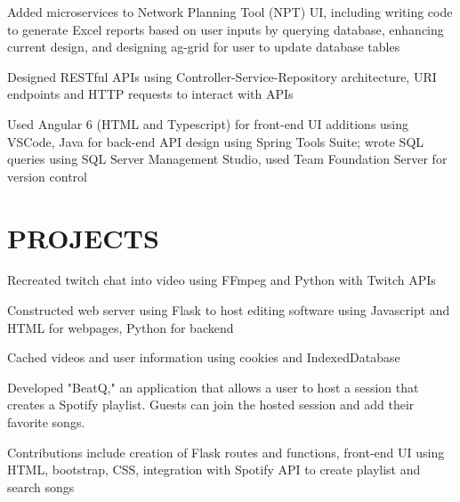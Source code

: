 \documentclass[]{deedy-resume-openfont}
\begin{document}
\begin{minipage}[t]{0.67\textwidth}

\begin{tightemize}
\item Added microservices to Network Planning Tool (NPT) UI, including writing code to generate Excel reports based on user inputs by querying database, enhancing current design, and designing ag-grid for user to update database tables
\item Designed RESTful APIs using Controller-Service-Repository architecture, URI endpoints and HTTP requests to interact with APIs
\item Used Angular 6 (HTML and Typescript) for front-end UI additions using VSCode, Java for back-end API design using Spring Tools Suite; wrote SQL queries using SQL Server Management Studio, used Team Foundation Server for version control
\end{tightemize}
\sectionsep


\section {PROJECTS}

\begin{tightemize}
\item Recreated twitch chat into video using FFmpeg and Python with Twitch APIs
\item Constructed web server using Flask to host editing software using Javascript and HTML for webpages, Python for backend
\item Cached videos and user information using cookies and IndexedDatabase
\end{tightemize}
\sectionsep

\begin{tightemize}
\item Developed "BeatQ," an application that allows a user to host a session that  creates a Spotify playlist. Guests can join the hosted session and add their favorite songs.
\item Contributions include creation of Flask routes and functions, front-end UI using HTML, bootstrap, CSS, integration with Spotify API to create playlist and search songs
\end{tightemize}
\sectionsep


\end{minipage}
\end{document}
